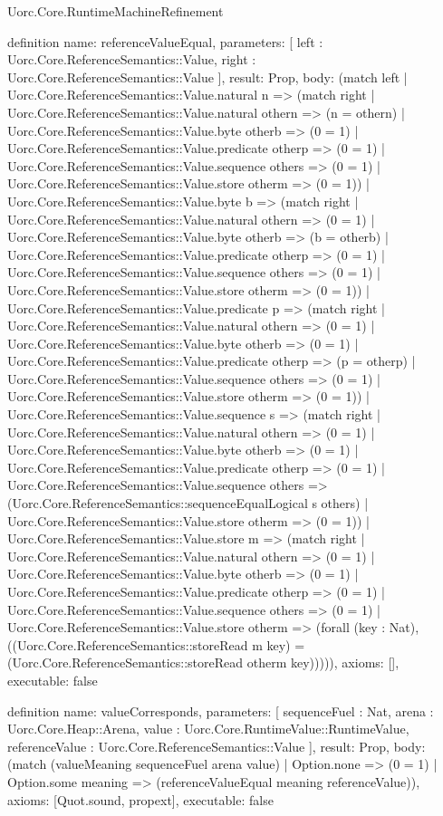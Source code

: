 \begin{lexlean}{Uorc.Core.RuntimeMachineRefinement}
\begin{semanticmodule}
definition{
  name: referenceValueEqual,
  parameters: [
    left : Uorc.Core.ReferenceSemantics::Value,
    right : Uorc.Core.ReferenceSemantics::Value
  ],
  result: Prop,
  body: (match left
    | Uorc.Core.ReferenceSemantics::Value.natural n => (match right
      | Uorc.Core.ReferenceSemantics::Value.natural othern => (n = othern)
      | Uorc.Core.ReferenceSemantics::Value.byte otherb => (0 = 1)
      | Uorc.Core.ReferenceSemantics::Value.predicate otherp => (0 = 1)
      | Uorc.Core.ReferenceSemantics::Value.sequence others => (0 = 1)
      | Uorc.Core.ReferenceSemantics::Value.store otherm => (0 = 1))
    | Uorc.Core.ReferenceSemantics::Value.byte b => (match right
      | Uorc.Core.ReferenceSemantics::Value.natural othern => (0 = 1)
      | Uorc.Core.ReferenceSemantics::Value.byte otherb => (b = otherb)
      | Uorc.Core.ReferenceSemantics::Value.predicate otherp => (0 = 1)
      | Uorc.Core.ReferenceSemantics::Value.sequence others => (0 = 1)
      | Uorc.Core.ReferenceSemantics::Value.store otherm => (0 = 1))
    | Uorc.Core.ReferenceSemantics::Value.predicate p => (match right
      | Uorc.Core.ReferenceSemantics::Value.natural othern => (0 = 1)
      | Uorc.Core.ReferenceSemantics::Value.byte otherb => (0 = 1)
      | Uorc.Core.ReferenceSemantics::Value.predicate otherp => (p = otherp)
      | Uorc.Core.ReferenceSemantics::Value.sequence others => (0 = 1)
      | Uorc.Core.ReferenceSemantics::Value.store otherm => (0 = 1))
    | Uorc.Core.ReferenceSemantics::Value.sequence s => (match right
      | Uorc.Core.ReferenceSemantics::Value.natural othern => (0 = 1)
      | Uorc.Core.ReferenceSemantics::Value.byte otherb => (0 = 1)
      | Uorc.Core.ReferenceSemantics::Value.predicate otherp => (0 = 1)
      | Uorc.Core.ReferenceSemantics::Value.sequence others => (Uorc.Core.ReferenceSemantics::sequenceEqualLogical s others)
      | Uorc.Core.ReferenceSemantics::Value.store otherm => (0 = 1))
    | Uorc.Core.ReferenceSemantics::Value.store m => (match right
      | Uorc.Core.ReferenceSemantics::Value.natural othern => (0 = 1)
      | Uorc.Core.ReferenceSemantics::Value.byte otherb => (0 = 1)
      | Uorc.Core.ReferenceSemantics::Value.predicate otherp => (0 = 1)
      | Uorc.Core.ReferenceSemantics::Value.sequence others => (0 = 1)
      | Uorc.Core.ReferenceSemantics::Value.store otherm => (forall (key : Nat), ((Uorc.Core.ReferenceSemantics::storeRead m key) = (Uorc.Core.ReferenceSemantics::storeRead otherm key))))),
  axioms: [],
  executable: false
}

definition{
  name: valueCorresponds,
  parameters: [
    sequenceFuel : Nat,
    arena : Uorc.Core.Heap::Arena,
    value : Uorc.Core.RuntimeValue::RuntimeValue,
    referenceValue : Uorc.Core.ReferenceSemantics::Value
  ],
  result: Prop,
  body: (match (valueMeaning sequenceFuel arena value)
    | Option.none => (0 = 1)
    | Option.some meaning => (referenceValueEqual meaning referenceValue)),
  axioms: [Quot.sound, propext],
  executable: false
}


\end{semanticmodule}
\end{lexlean}
